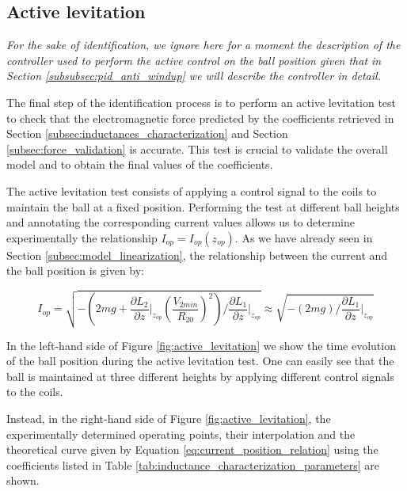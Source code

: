 \subsection{Active levitation}
\label{subsec:active_levitation}

\textit{
    For the sake of identification, we ignore here for a moment the description of the controller used to perform the active control on the ball position given that in Section \ref{subsubsec:pid_anti_windup} we will describe the controller in detail.
}

The final step of the identification process is to perform an active levitation test to check that the electromagnetic force predicted by the coefficients retrieved in Section \ref{subsec:inductances_characterization} and Section \ref{subsec:force_validation} is accurate.
This test is crucial to validate the overall model and to obtain the final values of the coefficients.

The active levitation test consists of applying a control signal to the coils to maintain the ball at a fixed position.
Performing the test at different ball heights and annotating the corresponding current values allows us to determine experimentally the relationship $I_{op} = I_{op}(z_{op})$.
As we have already seen in Section \ref{subsec:model_linearization}, the relationship between the current and the ball position is given by:

\begin{equation}
    I_{op} = \sqrt{ - \left(2m g + \frac{\partial L_2}{\partial z} \big|_{z_{op}} (\frac{V_{2min}}{R_{20}})^2 \right) / \frac{\partial L_1}{\partial z} \big|_{z_{op}} } \approx \sqrt{ - \left(2m g \right) / \frac{\partial L_1}{\partial z} \big|_{z_{op}} }
    \label{eq:current_position_relation}
\end{equation}

In the left-hand side of Figure \ref{fig:active_levitation} we show the time evolution of the ball position during the active levitation test.
One can easily see that the ball is maintained at three different heights by applying different control signals to the coils.

Instead, in the right-hand side of Figure \ref{fig:active_levitation}, the experimentally determined operating points, their interpolation and the theoretical curve given by Equation \ref{eq:current_position_relation} using the coefficients listed in Table \ref{tab:inductance_characterization_parameters} are shown.

